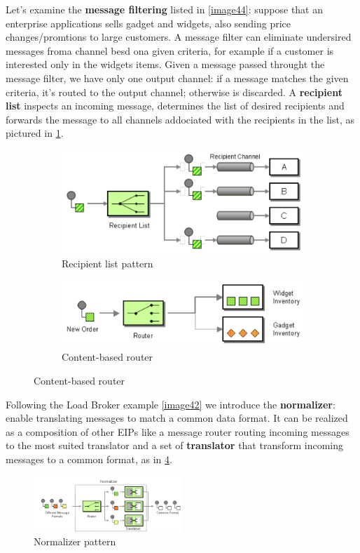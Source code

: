 \documentclass[10pt,a4paper]{report}
\begin{document}
Let's examine the \textbf{message filtering} listed in \ref{image44}: suppose that an enterprise applications sells gadget and widgets, also sending price changes/promtions to large customers. A message filter can eliminate undersired messages froma channel besd ona given criteria, for example if a customer is interested only in the widgets items. 
Given a message passed throught the message filter, we have only one output channel: if a message matches the given criteria, it's routed to the output channel; otherwise is discarded.
A \textbf{recipient list} inspects an incoming message, determines the list of desired recipients and forwards the message to all channels addociated with the recipients in the list, as pictured in \ref{image45}.

\begin{figure}
	\centering
	\begin{subfigure}{.5\textwidth}
		\centering
		\includegraphics[width=.9\linewidth]{image45}
		\caption{Recipient list pattern}
		\label{image45}
	\end{subfigure}%
	\begin{subfigure}{.5\textwidth}
		\centering
		\includegraphics[width=.9\linewidth]{image46}
		\caption{Content-based router}
		\label{image46}
	\end{subfigure}
	
	\label{image46a}
\end{figure}

Following the Load Broker example \ref{image42} we introduce the \textbf{normalizer}: enable translating messages to match a common data format. It can be realized as a composition of other EIPs like a message router routing incoming messages to the most suited translator and a set of \textbf{translator} that transform incoming messages to a common format, as in \ref{image47}.
   \begin{figure}[h]
 	\centering
 	\includegraphics[width=0.5\textwidth]{image47}
 	\caption{Normalizer pattern}
 	\label{image47}
 \end{figure}
\end{document}

